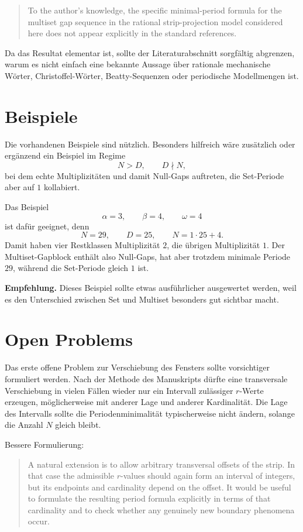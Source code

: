 \documentclass[11pt]{article}
\newcommand{\todo}[1]{\par\medskip\noindent\textbf{Empfehlung.} #1\par\medskip}
\begin{document}
\begin{quote}
To the author's knowledge, the specific minimal-period formula for the multiset gap sequence in the rational strip-projection model considered here does not appear explicitly in the standard references.
\end{quote}

Da das Resultat elementar ist, sollte der Literaturabschnitt sorgfältig abgrenzen, warum es nicht einfach eine bekannte Aussage über rationale mechanische Wörter, Christoffel-Wörter, Beatty-Sequenzen oder periodische Modellmengen ist.

\section{Beispiele}

Die vorhandenen Beispiele sind nützlich. Besonders hilfreich wäre zusätzlich oder ergänzend ein Beispiel im Regime
\[
    N>D,
    \qquad
    D\nmid N,
\]
bei dem echte Multiplizitäten und damit Null-Gaps auftreten, die Set-Periode aber auf \(1\) kollabiert.

Das Beispiel
\[
    \alpha=3,
    \qquad
    \beta=4,
    \qquad
    \omega=4
\]
ist dafür geeignet, denn
\[
    N=29,
    \qquad
    D=25,
    \qquad
    N=1\cdot 25+4.
\]
Damit haben vier Restklassen Multiplizität \(2\), die übrigen Multiplizität \(1\). Der Multiset-Gapblock enthält also Null-Gaps, hat aber trotzdem minimale Periode \(29\), während die Set-Periode gleich \(1\) ist.

\todo{Dieses Beispiel sollte etwas ausführlicher ausgewertet werden, weil es den Unterschied zwischen Set und Multiset besonders gut sichtbar macht.}

\section{Open Problems}

Das erste offene Problem zur Verschiebung des Fensters sollte vorsichtiger formuliert werden. Nach der Methode des Manuskripts dürfte eine transversale Verschiebung in vielen Fällen wieder nur ein Intervall zulässiger \(r\)-Werte erzeugen, möglicherweise mit anderer Lage und anderer Kardinalität. Die Lage des Intervalls sollte die Periodenminimalität typischerweise nicht ändern, solange die Anzahl \(N\) gleich bleibt.

Bessere Formulierung:

\begin{quote}
A natural extension is to allow arbitrary transversal offsets of the strip. In that case the admissible \(r\)-values should again form an interval of integers, but its endpoints and cardinality depend on the offset. It would be useful to formulate the resulting period formula explicitly in terms of that cardinality and to check whether any genuinely new boundary phenomena occur.
\end{quote}
\end{document}
